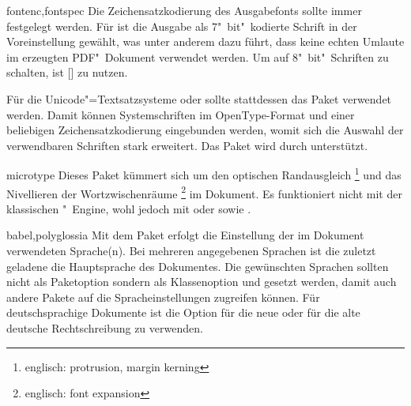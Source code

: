 \begin{packages}
\item[fontenc,fontspec]
  Die Zeichensatzkodierung des Ausgabefonts sollte immer festgelegt werden. Für 
   ist die Ausgabe als 7"~bit"~kodierte Schrift in der 
  Voreinstellung gewählt, was unter anderem dazu führt, dass keine echten
  Umlaute im erzeugten PDF"~Dokument verwendet werden. Um auf 8"~bit"~Schriften
  zu schalten, ist [] zu
  nutzen.
  
  Für die Unicode"=Textsatzsysteme  oder  
  sollte stattdessen das Paket  verwendet werden. Damit 
  können Systemschriften im OpenType-Format und einer beliebigen 
  Zeichensatzkodierung eingebunden werden, womit sich die Auswahl der 
  verwendbaren Schriften stark erweitert. Das Paket wird durch \TUDScript 
  unterstützt.
\item[microtype]
  Dieses Paket kümmert sich um den optischen Randausgleich%
  \footnote{englisch: protrusion, margin kerning}
  und das Nivellieren der Wortzwischenräume%
  \footnote{englisch: font expansion}
  im Dokument. Es funktioniert nicht mit der klassischen "~Engine, 
  wohl jedoch mit  oder  sowie .
\item[babel,polyglossia]
  Mit dem Paket  erfolgt die Einstellung der im Dokument 
  verwendeten Sprache(n). Bei mehreren angegebenen Sprachen ist die zuletzt 
  geladene die Hauptsprache des Dokumentes. Die gewünschten Sprachen sollten 
  nicht als Paketoption sondern als Klassenoption und gesetzt werden, damit 
  auch andere Pakete auf die Spracheinstellungen zugreifen können. Für 
  deutschsprachige Dokumente ist die Option  für die neue oder 
   für die alte deutsche Rechtschreibung zu verwenden. 
  

\end{packages}

